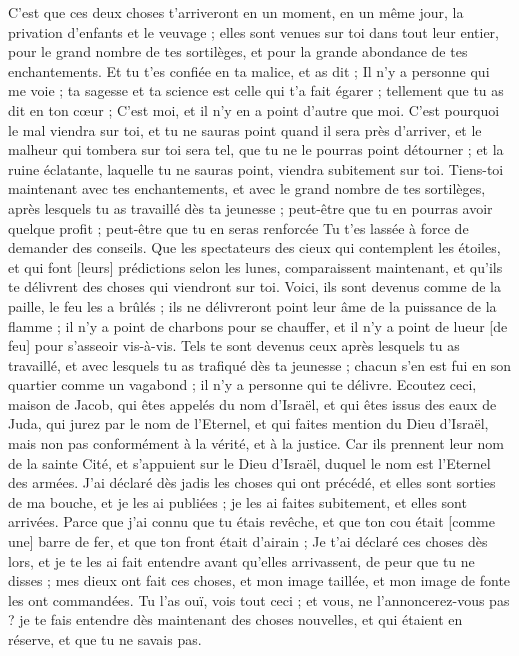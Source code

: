 \begin{multicols}{2}
C'est que ces deux choses t'arriveront en un moment, en un même jour, la privation d'enfants et le veuvage ; elles sont venues sur toi dans tout leur entier, pour le grand nombre de tes sortilèges, et pour la grande abondance de tes enchantements.
Et tu t'es confiée en ta malice, et as dit ; Il n'y a personne qui me voie ; ta sagesse et ta science est celle qui t'a fait égarer ; tellement que tu as dit en ton cœur ; C'est moi, et il n'y en a point d'autre que moi.
C'est pourquoi le mal viendra sur toi, et tu ne sauras point quand il sera près d'arriver, et le malheur qui tombera sur toi sera tel, que tu ne le pourras point détourner ; et la ruine éclatante, laquelle tu ne sauras point, viendra subitement sur toi.
Tiens-toi maintenant avec tes enchantements, et avec le grand nombre de tes sortilèges, après lesquels tu as travaillé dès ta jeunesse ; peut-être que tu en pourras avoir quelque profit ; peut-être que tu en seras renforcée
Tu t'es lassée à force de demander des conseils. Que les spectateurs des cieux qui contemplent les étoiles, et qui font [leurs] prédictions selon les lunes, comparaissent maintenant, et qu'ils te délivrent des choses qui viendront sur toi.
Voici, ils sont devenus comme de la paille, le feu les a brûlés ; ils ne délivreront point leur âme de la puissance de la flamme ; il n'y a point de charbons pour se chauffer, et il n'y a point de lueur [de feu] pour s'asseoir vis-à-vis.
Tels te sont devenus ceux après lesquels tu as travaillé, et avec lesquels tu as trafiqué dès ta jeunesse ; chacun s'en est fui en son quartier comme un vagabond ; il n'y a personne qui te délivre.
\VerseOne{}Ecoutez ceci, maison de Jacob, qui êtes appelés du nom d'Israël, et qui êtes issus des eaux de Juda, qui jurez par le nom de l'Eternel, et qui faites mention du Dieu d'Israël, mais non pas conformément à la vérité, et à la justice.
Car ils prennent leur nom de la sainte Cité, et s'appuient sur le Dieu d'Israël, duquel le nom est l'Eternel des armées.
J'ai déclaré dès jadis les choses qui ont précédé, et elles sont sorties de ma bouche, et je les ai publiées ; je les ai faites subitement, et elles sont arrivées.
Parce que j'ai connu que tu étais revêche, et que ton cou était [comme une] barre de fer, et que ton front était d'airain ;
Je t'ai déclaré ces choses dès lors, et je te les ai fait entendre avant qu'elles arrivassent, de peur que tu ne disses ; mes dieux ont fait ces choses, et mon image taillée, et mon image de fonte les ont commandées.
Tu l'as ouï, vois tout ceci ; et vous, ne l'annoncerez-vous pas ? je te fais entendre dès maintenant des choses nouvelles, et qui étaient en réserve, et que tu ne savais pas.

\end{multicols}
